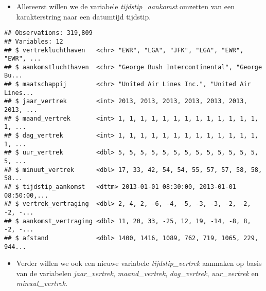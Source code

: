 \documentclass[]{memoir}
\newenvironment{Shaded}{\begin{snugshade}}{\end{snugshade}}
\newcommand{\KeywordTok}[1]{\textcolor[rgb]{0.13,0.29,0.53}{\textbf{#1}}}
\newcommand{\DataTypeTok}[1]{\textcolor[rgb]{0.13,0.29,0.53}{#1}}
\newcommand{\StringTok}[1]{\textcolor[rgb]{0.31,0.60,0.02}{#1}}
\newcommand{\OperatorTok}[1]{\textcolor[rgb]{0.81,0.36,0.00}{\textbf{#1}}}
\newcommand{\NormalTok}[1]{#1}
\providecommand{\tightlist}{%
  \setlength{\itemsep}{0pt}\setlength{\parskip}{0pt}}
\begin{document}
\begin{itemize}
\tightlist
\item
  Allereerst willen we de variabele \emph{tijdstip\_aankomst} omzetten
  van een karakterstring naar een datumtijd tijdstip.
\end{itemize}

\begin{Shaded}
\end{Shaded}

\begin{verbatim}
## Observations: 319,809
## Variables: 12
## $ vertrekluchthaven   <chr> "EWR", "LGA", "JFK", "LGA", "EWR", "EWR", ...
## $ aankomstluchthaven  <chr> "George Bush Intercontinental", "George Bu...
## $ maatschappij        <chr> "United Air Lines Inc.", "United Air Lines...
## $ jaar_vertrek        <int> 2013, 2013, 2013, 2013, 2013, 2013, 2013, ...
## $ maand_vertrek       <int> 1, 1, 1, 1, 1, 1, 1, 1, 1, 1, 1, 1, 1, 1, ...
## $ dag_vertrek         <int> 1, 1, 1, 1, 1, 1, 1, 1, 1, 1, 1, 1, 1, 1, ...
## $ uur_vertrek         <dbl> 5, 5, 5, 5, 5, 5, 5, 5, 5, 5, 5, 5, 5, 5, ...
## $ minuut_vertrek      <dbl> 17, 33, 42, 54, 54, 55, 57, 57, 58, 58, 58...
## $ tijdstip_aankomst   <dttm> 2013-01-01 08:30:00, 2013-01-01 08:50:00,...
## $ vertrek_vertraging  <dbl> 2, 4, 2, -6, -4, -5, -3, -3, -2, -2, -2, -...
## $ aankomst_vertraging <dbl> 11, 20, 33, -25, 12, 19, -14, -8, 8, -2, -...
## $ afstand             <dbl> 1400, 1416, 1089, 762, 719, 1065, 229, 944...
\end{verbatim}

\begin{itemize}
\tightlist
\item
  Verder willen we ook een nieuwe variabele \emph{tijdstip\_vertrek}
  aanmaken op basis van de variabelen \emph{jaar\_vertrek},
  \emph{maand\_vertrek}, \emph{dag\_vertrek}, \emph{uur\_vertrek} en
  \emph{minuut\_vertrek}.
\end{itemize}
\end{document}
